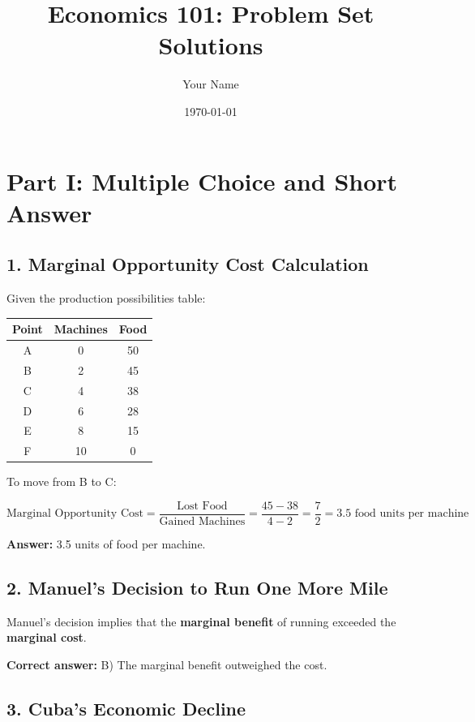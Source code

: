 \documentclass{article}
\title{Economics 101: Problem Set Solutions}
\author{Your Name}
\date{\today}
\begin{document}
\maketitle

\section*{Part I: Multiple Choice and Short Answer}

\subsection*{1. Marginal Opportunity Cost Calculation}

Given the production possibilities table:

\begin{center}
    \begin{tabular}{|c|c|c|}
        \hline
        Point & Machines & Food \\
        \hline
        A & 0 & 50 \\
        B & 2 & 45 \\
        C & 4 & 38 \\
        D & 6 & 28 \\
        E & 8 & 15 \\
        F & 10 & 0 \\
        \hline
    \end{tabular}
\end{center}

To move from B to C:

\[
\text{Marginal Opportunity Cost} = \frac{\text{Lost Food}}{\text{Gained Machines}} = \frac{45 - 38}{4 - 2} = \frac{7}{2} = 3.5 \text{ food units per machine}
\]

\textbf{Answer:} 3.5 units of food per machine.

\subsection*{2. Manuel's Decision to Run One More Mile}

Manuel's decision implies that the \textbf{marginal benefit} of running exceeded the \textbf{marginal cost}. 

\textbf{Correct answer:} B) The marginal benefit outweighed the cost.

\subsection*{3. Cuba's Economic Decline}
\end{document}
